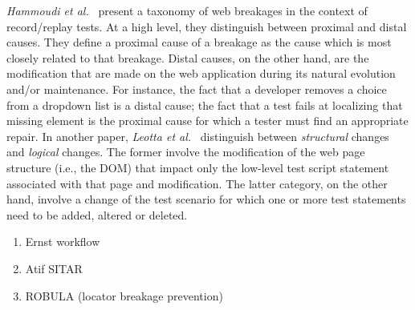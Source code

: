 \textit{Hammoudi et al.}~\cite{Hammoudi-2016-ICST} present a taxonomy of web breakages in the context of record/replay tests. At a high level, they distinguish between proximal and distal causes. They define a proximal cause of a breakage as the cause which is most closely related to that breakage. Distal causes, on the other hand, are the modification that are made on the web application during its natural evolution and/or maintenance. For instance, the fact that a developer removes a choice from a dropdown list is a distal cause; the fact that a test fails at localizing that missing element is the proximal cause for which a tester must find an appropriate repair. 
%
In another paper, \textit{Leotta et al.}~\cite{2016-leotta-Advances} distinguish between \textit{structural} changes and \textit{logical} changes. The former involve the modification of the web page structure (i.e., the DOM) that impact only the low-level test script statement associated with that page and modification. The latter category, on the other hand, involve a change of the test scenario for which one or more test statements need to be added, altered or deleted.





\begin{enumerate}
\item Ernst workflow
\item Atif SITAR
\item ROBULA (locator breakage prevention)
\end{enumerate}
